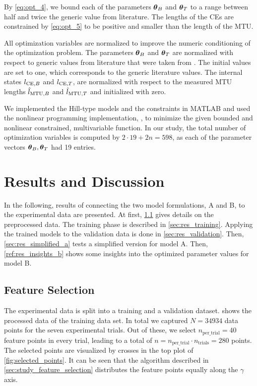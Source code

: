 By \cref{eq:opt_4}, we bound each of the parameters $\boldsymbol{\theta}_B$ and $\boldsymbol{\theta}_T$ to a range between half and twice the generic value from literature.
The lengths of the CEs are constrained by \cref{eq:opt_5} to be positive and smaller than the length of the MTU.

All optimization variables are normalized to improve the numeric conditioning of the optimization problem. 
The parameters $\boldsymbol{\theta}_B$ and $\boldsymbol{\theta}_T$ are normalized with respect to generic values from literature that were taken from \cite{Gunther2007, Morl2012, Hilltype2014}. The initial values are set to one, which corresponds to the generic literature values.
The internal states $l_{\text{CE},B}$ and $l_{\text{CE},T}$, are normalized with respect to the measured MTU lengths $\hat{l}_{\text{MTU},B}$ and $\hat{l}_{\text{MTU},T}$ and initialized with zero.

We implemented the Hill-type models and the constraints in MATLAB and used the nonlinear programming implementation, , to minimize the given bounded and nonlinear constrained, multivariable function.
In our study, the total number of optimization variables is computed by $2\cdot 19 + 2n = 598$, as each of the parameter vectors $\boldsymbol{\theta}_B,\boldsymbol{\theta}_T$ had 19 entries. 

\section{Results and Discussion}\label{sec:evaluation}

In the following, results of connecting the two model formulations, A and B, to the experimental data are presented.
At first, \cref{sec:res_feature_selection} gives details on the preprocessed data. The training phase is described in \cref{sec:res_training}. Applying the trained models to the validation data is done in \cref{sec:res_validation}. Then, \cref{sec:res_simplified_a} tests a simplified version for model A. Then, \cref{ref:res_insights_b} shows some insights into the optimized parameter values for model B.

\subsection{Feature Selection}\label{sec:res_feature_selection}
The experimental data is split into a training and a validation dataset.  shows the processed data of the training data set. In total we captured $N=\num{34934}$ data points for the seven experimental trials. Out of these, we select $n_\text{per\_trial}=\num{40}$ feature points in every trial, leading to a total of $n=n_\text{per\_trial}\cdot n_\text{trials}=\num{280}$ points. The selected points are visualized by crosses in the top plot of \cref{fig:selected_points}. It can be seen that the algorithm described in \cref{sec:study_feature_selection} distributes the feature points equally along the $\gamma$ axis.

